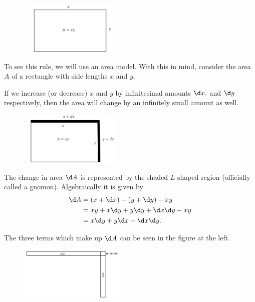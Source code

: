 \begin{figure}
\captionsetup{labelformat=empty}
\centerline{\includegraphics*[height=1in,width=2in]{Figures/ProductRule1}}
\label{fig:}
\end{figure}
To see this rule, we will use an area model.  With this in mind,
consider the area $A$ of a rectangle with side lengths $x$ and $y.$ 


If we increase (or decrease) $x$ and $y$ by infinitesimal amounts $\d x,$ and $\d y$
respectively, then the area will change by an infinitely small amount
as well.
\begin{figure}
\captionsetup{labelformat=empty}
\centerline{\includegraphics*[height=1in,width=2in]{Figures/ProductRule2}}
\label{fig:}
\end{figure}

The change in area $\d A$ is represented by the shaded $L$ shaped
region (officially called a gnomon).  Algebraically it is given by
\begin{align*}
\d A&=(x+\d x)-(y+\d y)-xy\\
    &=xy+x\d y+y\d y+\d x \d y-xy\\
    &=x\d y+y\d x+\d x \d y.
\end{align*}

The three terms which make up $\d A$ can be seen in the figure at the
left.

\begin{figure}
\captionsetup{labelformat=empty}
\centerline{\includegraphics*[height=1in,width=2in]{Figures/gnomon1}}
\label{fig:}
\end{figure}

